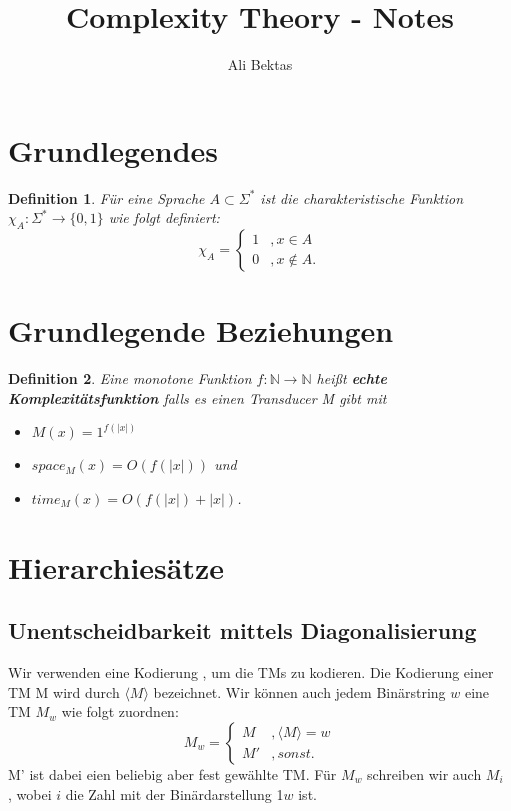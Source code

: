 \documentclass{article}
\author{Ali Bektas}
\title{Complexity Theory - Notes}
\newtheorem{definition}{Definition}[section]
\begin{document}
	\maketitle
	\newpage
	\tableofcontents
	\newpage


	\section{Grundlegendes}
	
	\begin{definition}
		Für eine Sprache $A \subset \Sigma^* $ ist die charakteristische Funktion $\chi_A \colon \Sigma^* \rightarrow \{0, 1\}$ wie folgt definiert:
		\[
			\chi_A = \begin{cases}
					1 &, x \in A \\
					0 &, x \notin A.
				\end{cases}
		\]
	\end{definition}

\section{Grundlegende Beziehungen}
	\begin{definition} \label{complexity_function}
		Eine monotone Funktion $f \colon \mathbb{N} \rightarrow \mathbb{N}$ heißt \textbf{echte Komplexitätsfunktion} falls es einen Transducer M gibt mit\\
		\begin{itemize}
			\item $M(x) = 1^{f(|x|)}$
			\item $space_M(x) = O(f(|x|))$ und
			\item $time_M(x) = O(f(|x|)+|x|)$.
		\end{itemize}
	\end{definition}
	

\section{Hierarchiesätze}
	
	
	\subsection{Unentscheidbarkeit mittels Diagonalisierung}

	Wir verwenden eine Kodierung , um die TMs zu kodieren. Die 
	Kodierung einer TM M wird durch $ \langle M \rangle $ bezeichnet. Wir können auch jedem Binärstring $w$ eine TM $M_w$ wie folgt zuordnen:
		\[ M_w = \begin{cases}
				M &, \langle M \rangle = w \\
				M'&, sonst.
				\end{cases}
		  \]
  	M' ist dabei eien beliebig aber fest gewählte TM. Für $M_w$ schreiben wir auch $M_i$ , wobei $i$ die Zahl mit der Binärdarstellung 1$w$ ist.
\end{document}
